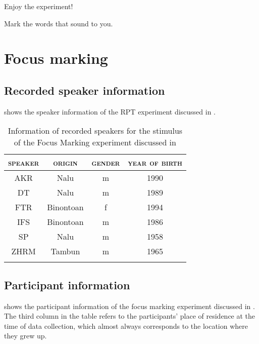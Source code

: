Enjoy the experiment!\newline

Mark the words that sound      to you.


\section{Focus marking}\label{sec:prosodic-prominence}

\subsection{Recorded speaker information}\label{sec:foc_rec-information}

  shows the speaker information of the RPT experiment discussed in  .


\begin{table}
	\caption{Information of recorded speakers for the stimulus of the Focus Marking experiment discussed in  }
	\label{foc_rec_Speaker_RPT}
	\begin{tabular}{cccc}
			\lsptoprule
					\textsc{speaker} & 			\textsc{origin} & \textsc{gender} & \textsc{year of birth} \\
		\midrule
		AKR        & Nalu       &m&     1990   \\
		DT        & Nalu            &m&1989\\
		FTR       & Binontoan       &f&  1994   \\
		IFS        & Binontoan            &m&  1986 \\
		SP         &   Nalu              &m&1958\\
		ZHRM        & Tambun         &m&  1965     \\
			
		\lspbottomrule
	\end{tabular}
\end{table}


\subsection{Participant information}\label{sec:foc_participant-information}

  shows the participant information of the focus marking  experiment discussed in  . The third column in the table refers to the participants' place of residence at the time of data collection, which almost always corresponds to the location where they grew up.

